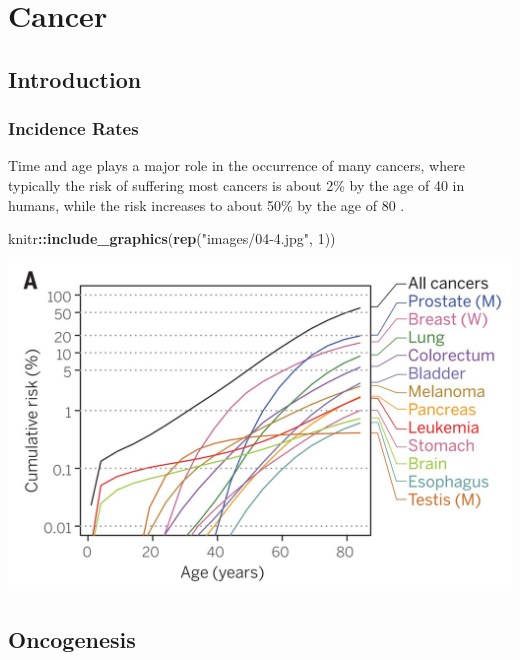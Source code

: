 \documentclass[]{book}
\newenvironment{Shaded}{\begin{snugshade}}{\end{snugshade}}
\newcommand{\KeywordTok}[1]{\textcolor[rgb]{0.13,0.29,0.53}{\textbf{#1}}}
\newcommand{\DecValTok}[1]{\textcolor[rgb]{0.00,0.00,0.81}{#1}}
\newcommand{\StringTok}[1]{\textcolor[rgb]{0.31,0.60,0.02}{#1}}
\newcommand{\OperatorTok}[1]{\textcolor[rgb]{0.81,0.36,0.00}{\textbf{#1}}}
\newcommand{\NormalTok}[1]{#1}
\begin{document}
\chapter{Cancer}\label{cancer}

\section{Introduction}\label{introduction-3}

\subsection{Incidence Rates}\label{incidence-rates}

Time and age plays a major role in the occurrence of many cancers, where
typically the risk of suffering most cancers is about 2\% by the age of
40 in humans, while the risk increases to about 50\% by the age of 80
\citep{martincorena2015somatic}.

\begin{Shaded}
\begin{Highlighting}[]
\NormalTok{knitr}\OperatorTok{::}\KeywordTok{include_graphics}\NormalTok{(}\KeywordTok{rep}\NormalTok{(}\StringTok{"images/04-4.jpg"}\NormalTok{, }\DecValTok{1}\NormalTok{))}
\end{Highlighting}
\end{Shaded}

\includegraphics{images/04-4.jpg}

\section{Oncogenesis}\label{oncogenesis}
\end{document}
